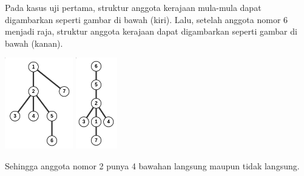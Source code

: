 \documentclass{article}
\begin{document}
Pada kasus uji pertama, struktur anggota kerajaan mula-mula dapat digambarkan seperti gambar di bawah (kiri). Lalu, setelah anggota nomor 6 menjadi raja, struktur anggota kerajaan dapat digambarkan seperti gambar di bawah (kanan).

\includegraphics[height=150px]{sample-2-1}
\includegraphics[height=150px]{sample-2-2}

Sehingga anggota nomor 2 punya 4 bawahan langsung maupun tidak langsung.
\end{document}
